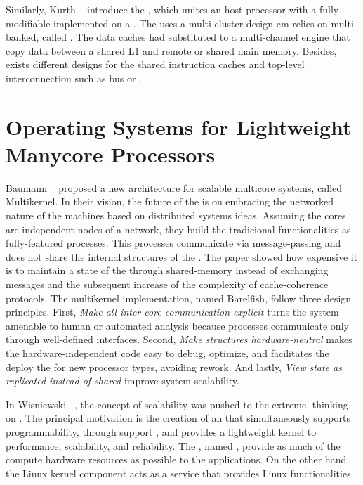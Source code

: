 	Similarly, Kurth \etal~\cite{Kurth2017} introduce the \hero, which unites an \arm
	host processor with a fully modifiable \riscv \manycore implemented on a \fpga.
	The \pmca uses a multi-cluster design em relies on multi-banked, called \spms.
	The data caches had substituted to a multi-channel \dma engine that copy data
	between a shared L1 \spm and remote \smps or shared main memory.
	Besides, exists different designs for the shared instruction caches and
	top-level interconnection such as bus or \noc.

\section{Operating Systems for Lightweight Manycore Processors}

	Baumann \etal~\cite{Baumann2009} proposed a new \os architecture for scalable multicore
	systems, called Multikernel.
	In their vision, the future of the \oses is on embracing the networked nature
	of the machines based on distributed systems ideas.
	Assuming the cores are independent nodes of a network, they build the tradicional
	\os functionalities as fully-featured processes.
	This processes communicate via message-passing and does not share the internal
	structures of the \os.
	The paper showed how expensive it is to maintain a state of the \os through
	shared-memory instead of exchanging messages and the subsequent increase of
	the complexity of cache-coherence protocols.
	The multikernel implementation, named Barelfish, follow three design principles.
	First, \textit{Make all inter-core communication explicit} turns the system
	amenable to human or automated analysis because processes communicate only
	through well-defined interfaces.
	Second, \textit{Make \os structures hardware-neutral} makes the hardware-independent
	code easy to debug, optimize, and facilitates the deploy the \os for new
	processor types, avoiding rework.
	And lastly, \textit{View \os state as replicated instead of shared} improve system
	scalability.

	In Wisniewski~\cite{Wisniewski2014} \etal, the concept of scalability was pushed
	to the extreme, thinking on \hpc.
	The principal motivation is the creation of an \os that simultaneously supports
	programmability, through support \linux \api, and provides a lightweight kernel
	to performance, scalability, and reliability.
	The \os, named \mos, provide as much of the compute hardware resources as
	possible to the \hpc applications. On the other hand, the Linux kernel
	component acts as a service that provides Linux functionalities.
	
